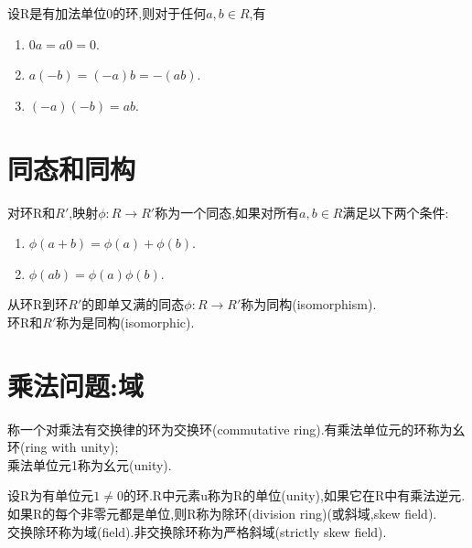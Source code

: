 \documentclass[oneside,openany]{ctexbook}
\begin{document}
\begin{definition}{}{}
设R是有加法单位0的环,则对于任何$a,b\in R$,有
\begin{enumerate}
  \item $0a=a0=0$.
  \item $a(-b)=(-a)b=-(ab)$.
  \item $(-a)(-b)=ab$.
\end{enumerate}
\end{definition}


\section{同态和同构}

\begin{definition}{}{}
对环R和$R'$,映射$\phi :R\rightarrow R'$称为一个同态,如果对所有$a,b\in R$满足以下两个条件:
\begin{enumerate}
  \item $\phi (a+b)=\phi (a)+\phi (b)$.
  \item $\phi (ab)=\phi (a)\phi (b)$.
\end{enumerate}
\end{definition}

\begin{definition}{}{}
从环R到环$R'$的即单又满的同态$\phi :R\rightarrow R'$称为同构\textnormal{(isomorphism)}.\\
环R和$R'$称为是同构\textnormal{(isomorphic)}.
\end{definition}

\section{乘法问题:域}

\begin{definition}{}{}
称一个对乘法有交换律的环为交换环(commutative ring).有乘法单位元的环称为幺环\textnormal{(ring with unity)};\\
乘法单位元\textnormal{1}称为幺元\textnormal{(unity)}.
\end{definition}

\begin{definition}{}{}
设R为有单位元$1\neq 0$的环.R中元素u称为R的单位\textnormal{(unity)},如果它在R中有乘法逆元.\\
如果R的每个非零元都是单位,则R称为除环\textnormal{(division ring)}\textnormal{(或斜域,skew field)}.\\
交换除环称为域\textnormal{(field)}.非交换除环称为严格斜域\textnormal{(strictly skew field)}.
\end{definition}
\end{document}
